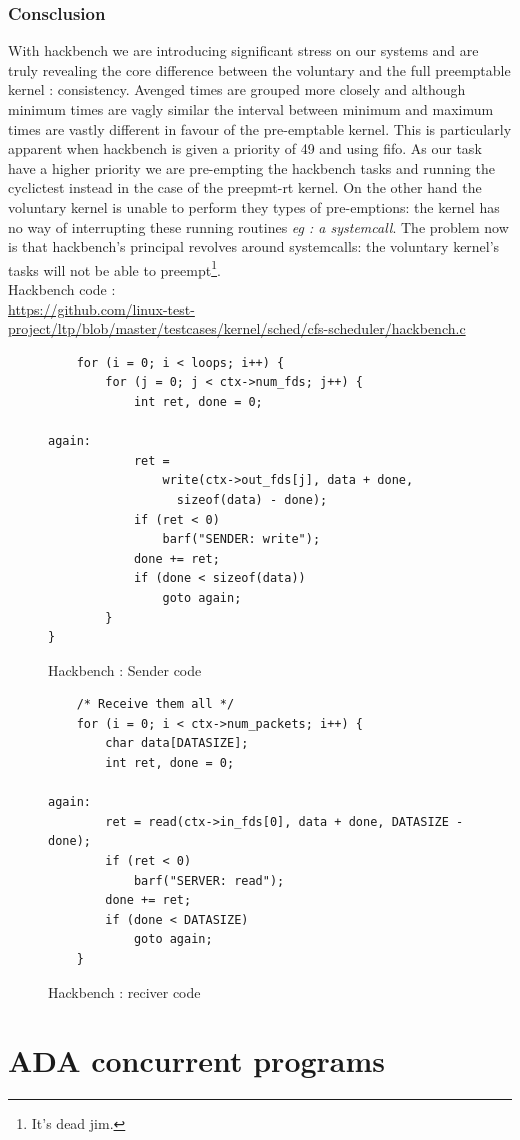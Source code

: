 \documentclass[10pt,a4paper]{article}
\begin{document}
\subsubsection{Consclusion}
With hackbench we are introducing significant stress on our systems and are truly revealing the core difference between the voluntary and the full preemptable kernel : consistency. Avenged times are grouped more closely and although minimum times are vagly similar the interval between minimum and maximum times are vastly different in favour of the pre-emptable kernel.
This is particularly apparent when hackbench is given a priority of 49 and using fifo. As our task have a higher priority we are pre-empting the hackbench tasks and running the cyclictest instead in the case of the preepmt-rt kernel. On the other hand the voluntary kernel is unable to perform they types of pre-emptions: the kernel has no way of interrupting these running routines \textit{eg : a systemcall}. The problem now is that hackbench's principal revolves around systemcalls: the voluntary kernel's tasks will not be able to preempt\footnote{It's dead jim.}.\\
Hackbench code : \\
\url{https://github.com/linux-test-project/ltp/blob/master/testcases/kernel/sched/cfs-scheduler/hackbench.c}
\begin{figure}[H]

\begin{lstlisting}
	for (i = 0; i < loops; i++) {
		for (j = 0; j < ctx->num_fds; j++) {
			int ret, done = 0;

again:
			ret =
			    write(ctx->out_fds[j], data + done,
				  sizeof(data) - done);
			if (ret < 0)
				barf("SENDER: write");
			done += ret;
			if (done < sizeof(data))
				goto again;
		}
}

\end{lstlisting}
\caption{Hackbench : Sender code}
\end{figure}
\begin{figure}[H]
\begin{lstlisting}
	/* Receive them all */
	for (i = 0; i < ctx->num_packets; i++) {
		char data[DATASIZE];
		int ret, done = 0;

again:
		ret = read(ctx->in_fds[0], data + done, DATASIZE - done);
		if (ret < 0)
			barf("SERVER: read");
		done += ret;
		if (done < DATASIZE)
			goto again;
	}
\end{lstlisting}
\caption{Hackbench : reciver code}
\end{figure}
\section{ADA concurrent programs}
\end{document}
